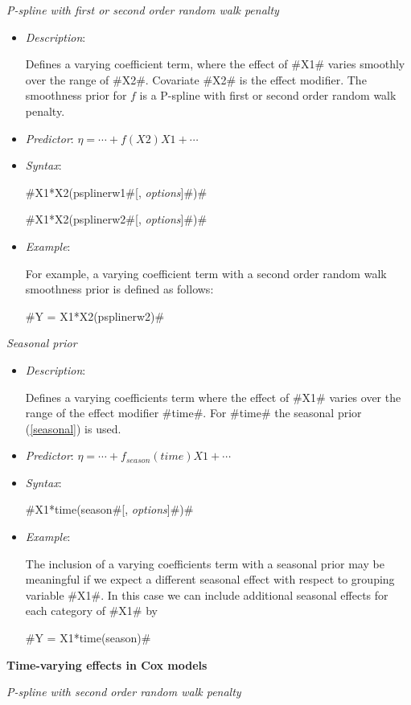 {\em P-spline with first or second order random walk penalty}
\begin{itemize}
\item[] {\em Description}:

Defines a varying coefficient term, where the effect of #X1# varies
smoothly over the range of #X2#. Covariate #X2# is the effect
modifier. The smoothness prior for $f$ is a P-spline with first or
second order random walk penalty.
\item[] {\em Predictor}: $\eta= \cdots + f(X2)X1 + \cdots$
\item[] {\em Syntax}:

#X1*X2(psplinerw1#[, {\em options}]#)#

#X1*X2(psplinerw2#[, {\em options}]#)#
\item[] {\em Example}:

For example, a varying coefficient term with a second order random
walk smoothness prior is defined as follows:

#Y = X1*X2(psplinerw2)#

\end{itemize}

{\em Seasonal prior}
\begin{itemize}
\item[] {\em Description}:

Defines a varying coefficients term where the effect of #X1# varies
over the range of the effect modifier #time#. For #time# the
seasonal prior (\ref{seasonal}) is used.
\item[] {\em Predictor}: $\eta= \cdots + f_{season}(time)X1 + \cdots $
\item[] {\em Syntax}:

#X1*time(season#[, {\em options}]#)#
\item[] {\em Example}:

The inclusion of a varying coefficients term with a seasonal prior
may be meaningful if we expect a different seasonal effect with
respect to grouping variable #X1#. In this case we can include
additional seasonal effects for each category of #X1# by

#Y = X1*time(season)#

\end{itemize}

{\bf Time-varying effects in Cox models}
\medskip

{\em P-spline with second order random walk penalty}

